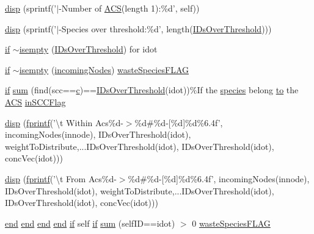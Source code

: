 \begin{DoxyCompactItemize}
\item 
\hyperlink{a00022_a704f6a3e79085b49d18c11aef7557537}{disp} (sprintf('$|$-\/Number of \hyperlink{a00022_ad72e1068795c577213481e5db7f3e925}{A\-C\-S}(length 1)\-:\%d', self))
\item 
\hyperlink{a00022_af25763ebf0b0cb4d7be99354cb508d6c}{disp} (sprintf('$|$-\/Species over threshold\-:\%d', length(\hyperlink{a00022_a67c695f856b6731644c6a128e602a323}{I\-Ds\-Over\-Threshold})))
\item 
\hyperlink{a00024_a01d55766b8058903dd360b4bda71f9f5}{if} \hyperlink{a00022_a24848888296d4402cbc939dd46943b2e}{$\sim$isempty} (\hyperlink{a00022_a67c695f856b6731644c6a128e602a323}{I\-Ds\-Over\-Threshold}) for idot
\item 
\hyperlink{a00024_a01d55766b8058903dd360b4bda71f9f5}{if} \hyperlink{a00022_a543bfe85f39da7f7882db16b78ac225e}{$\sim$isempty} (\hyperlink{a00022_a34c98e3306059653f2a214e5ef975e9c}{incoming\-Nodes}) \hyperlink{a00022_a86a34d23ef767cc82038231f868cea96}{waste\-Species\-F\-L\-A\-G}
\item 
\hyperlink{a00024_a01d55766b8058903dd360b4bda71f9f5}{if} \hyperlink{a00022_aeb4896ef772d3a8b71682107881e86b1}{sum} (find(scc==\hyperlink{a00029_a6be92348ba85ef257b11d06209e1d7b6}{c})==\hyperlink{a00022_a67c695f856b6731644c6a128e602a323}{I\-Ds\-Over\-Threshold}(idot))\%If the \hyperlink{a00016}{species} belong \hyperlink{a00022_af71dbe52628a3f83a77ab494817525c6}{to} the \hyperlink{a00022_ad72e1068795c577213481e5db7f3e925}{A\-C\-S} \hyperlink{a00022_af1605fa33751cda7e0c840d6df8f8a59}{in\-S\-C\-C\-Flag}
\item 
\hyperlink{a00022_a2966730036d0549661e4d262b15beaf9}{disp} (\hyperlink{a00062_aa6dc40efe43a338c9ff278260d95b4d9}{fprintf}('\textbackslash{}t Within Acs\%d-\/$>$\%d\#\%d-\/\mbox{[}\%d\mbox{]}\%d\%6.\-4f', incoming\-Nodes(innode), I\-Ds\-Over\-Threshold(idot), weight\-To\-Distribute,...\-I\-Ds\-Over\-Threshold(idot), I\-Ds\-Over\-Threshold(idot), conc\-Vec(idot)))
\item 
\hyperlink{a00022_a5f7c41b053ae4e4e6df81041800ed0c1}{disp} (\hyperlink{a00062_aa6dc40efe43a338c9ff278260d95b4d9}{fprintf}('\textbackslash{}t From Acs\%d-\/$>$\%d\#\%d-\/\mbox{[}\%d\mbox{]}\%d\%6.\-4f', incoming\-Nodes(innode), I\-Ds\-Over\-Threshold(idot), weight\-To\-Distribute,...\-I\-Ds\-Over\-Threshold(idot), I\-Ds\-Over\-Threshold(idot), conc\-Vec(idot)))
\item 
\hyperlink{a00019_afb358f48b1646c750fb9da6c6585be2b}{end} \hyperlink{a00019_afb358f48b1646c750fb9da6c6585be2b}{end} \hyperlink{a00019_afb358f48b1646c750fb9da6c6585be2b}{end} \hyperlink{a00019_afb358f48b1646c750fb9da6c6585be2b}{end} \hyperlink{a00024_a01d55766b8058903dd360b4bda71f9f5}{if} self \hyperlink{a00024_a01d55766b8058903dd360b4bda71f9f5}{if} \hyperlink{a00022_a5330c3728d2e8d052841f1bbf8d33845}{sum} (self\-I\-D==idot) $>$ 0 \hyperlink{a00022_a86a34d23ef767cc82038231f868cea96}{waste\-Species\-F\-L\-A\-G}

\end{DoxyCompactItemize}
